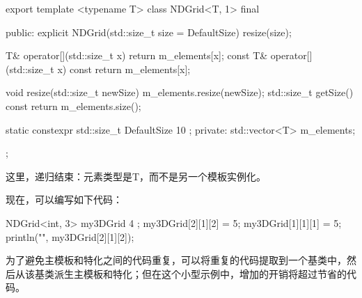 \begin{cpp}
export template <typename T>
class NDGrid<T, 1> final
{
    public:
        explicit NDGrid(std::size_t size = DefaultSize) { resize(size); }

        T& operator[](std::size_t x) { return m_elements[x]; }
        const T& operator[](std::size_t x) const { return m_elements[x]; }

        void resize(std::size_t newSize) { m_elements.resize(newSize); }
        std::size_t getSize() const { return m_elements.size(); }

        static constexpr std::size_t DefaultSize { 10 };
    private:
        std::vector<T> m_elements;
};
\end{cpp}

这里，递归结束：元素类型是T，而不是另一个模板实例化。

现在，可以编写如下代码：

\begin{cpp}
NDGrid<int, 3> my3DGrid { 4 };
my3DGrid[2][1][2] = 5;
my3DGrid[1][1][1] = 5;
println("{}", my3DGrid[2][1][2]);
\end{cpp}

为了避免主模板和特化之间的代码重复，可以将重复的代码提取到一个基类中，然后从该基类派生主模板和特化；但在这个小型示例中，增加的开销将超过节省的代码。













